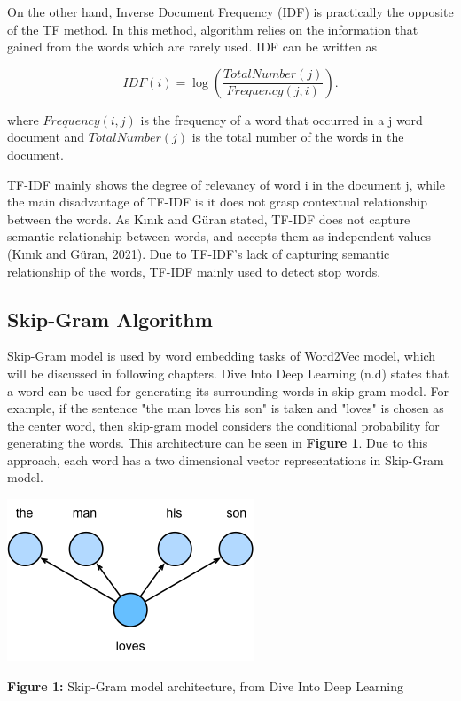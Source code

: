 \documentclass[man]{apa7}
\begin{document}
On the other hand, Inverse Document Frequency (IDF) is practically the opposite of the TF method. In this method, algorithm relies on the information that gained from the words which are rarely used. IDF can be written as

\begin{equation}
IDF (i) = \log (\frac{TotalNumber(j)}{Frequency(j,i)}).
\end{equation}

where $Frequency(i,j)$ is the frequency of a word that occurred in a j word document and $TotalNumber(j)$ is the total number of the words in the document.

TF-IDF mainly shows the degree of relevancy of word i in the document j, while the main disadvantage of TF-IDF is it does not grasp contextual relationship between the words. As Kınık and Güran stated, TF-IDF does not capture semantic relationship between words, and accepts them as independent values (Kınık and Güran, 2021). Due to TF-IDF's lack of capturing semantic relationship of the words, TF-IDF mainly used to detect stop words.

\subsection{Skip-Gram Algorithm}
Skip-Gram model is used by word embedding tasks of Word2Vec model, which will be discussed in following chapters. Dive Into Deep Learning (n.d) states that a word can be used for generating its surrounding words in skip-gram model. For example, if the sentence "the man loves his son" is taken and "loves" is chosen as the center word, then skip-gram model considers the conditional probability for generating the words. This architecture can be seen in \textbf{Figure 1}. Due to this approach, each word has a two dimensional vector representations in Skip-Gram model. 

\begin{center}

\includegraphics[scale=1]{skip-gram.png}

\textbf{Figure 1:} Skip-Gram model architecture, from Dive Into Deep Learning\\[2\baselineskip]

\end{center}
\end{document}
